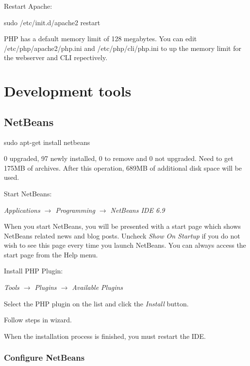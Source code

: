 \documentclass[ebook,10pt,twoside,openright]{memoir}
\begin{document}
Restart Apache:

\begin{squashboxcommand}
sudo /etc/init.d/apache2 restart
\end{squashboxcommand}

PHP has a default memory limit of 128 megabytes. You can edit /etc/php/apache2/php.ini and /etc/php/cli/php.ini to up the memory limit for the webserver and CLI repectively.

\chapter{Development tools} \label{chdevtools}

\section{NetBeans}

\begin{squashboxcommand}
sudo apt-get install netbeans
\end{squashboxcommand}

0 upgraded, 97 newly installed, 0 to remove and 0 not upgraded.
Need to get 175MB of archives.
After this operation, 689MB of additional disk space will be used.

Start NetBeans:

\emph{Applications $\rightarrow$ Programming $\rightarrow$ NetBeans IDE 6.9}

When you start NetBeans, you will be presented with a start page which shows NetBeans related news and blog posts. Uncheck \emph{Show On Startup} if you do not wish to see this page every time you launch NetBeans. You can always access the start page from the Help menu.

Install PHP Plugin:

\emph{Tools $\rightarrow$ Plugins $\rightarrow$ Available Plugins}

Select the PHP plugin on the list and click the \emph{Install} button.

Follow steps in wizard.

When the installation process is finished, you must restart the IDE.

\subsection{Configure NetBeans}
\end{document}
